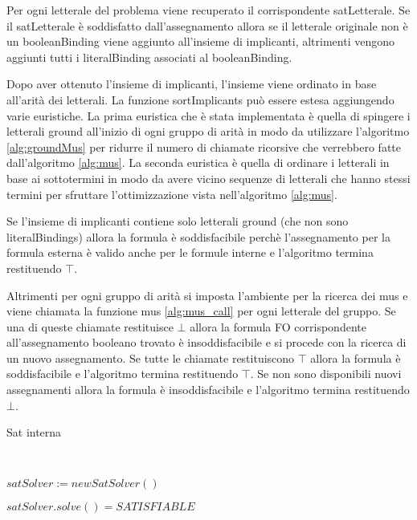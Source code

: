 \documentclass[./main.tex]{subfiles}
\begin{document}
Per ogni letterale del problema 
viene recuperato il corrispondente satLetterale.
Se il satLetterale è soddisfatto dall'assegnamento allora 
se il letterale originale non è un booleanBinding viene aggiunto all'insieme di implicanti,
altrimenti vengono aggiunti tutti i literalBinding associati al booleanBinding.

Dopo aver ottenuto l'insieme di implicanti, l'insieme viene ordinato in base all'arità dei letterali.
La funzione sortImplicants può essere estesa aggiungendo varie euristiche.
La prima euristica che è stata implementata è quella di spingere i letterali ground all'inizio di ogni gruppo di arità in modo da utilizzare 
l'algoritmo \ref{alg:groundMus} per ridurre il numero di chiamate ricorsive che verrebbero fatte dall'algoritmo \ref{alg:mus}.
La seconda euristica è quella di ordinare i letterali in base ai sottotermini in modo da avere vicino sequenze di letterali
che hanno stessi termini per sfruttare l'ottimizzazione vista nell'algoritmo \ref{alg:mus}.

Se l'insieme di implicanti contiene solo letterali ground (che non sono literalBindings) allora la formula è soddisfacibile
perchè l'assegnamento per la formula esterna è valido anche per le formule interne e l'algoritmo termina restituendo $\top$.

Altrimenti per ogni gruppo di arità si imposta l'ambiente per la ricerca dei mus
e viene chiamata la funzione mus \ref{alg:mus_call} per ogni letterale del gruppo.
Se una di queste chiamate restituisce $\bot$ allora la formula FO corrispondente 
all'assegnamento booleano trovato è insoddisfacibile e si procede con la ricerca di un nuovo assegnamento.
Se tutte le chiamate restituiscono $\top$ allora la formula è soddisfacibile e l'algoritmo termina restituendo $\top$.
Se non sono disponibili nuovi assegnamenti allora la formula è insoddisfacibile e l'algoritmo termina restituendo $\bot$.

\begin{algorithm}[H] \label{alg:internalSat}
    \caption{Sat interna}
    \\

$satSolver := newSatSolver()$\;

\Return $satSolver.solve() = SATISFIABLE$\;
\end{algorithm}
\end{document}
